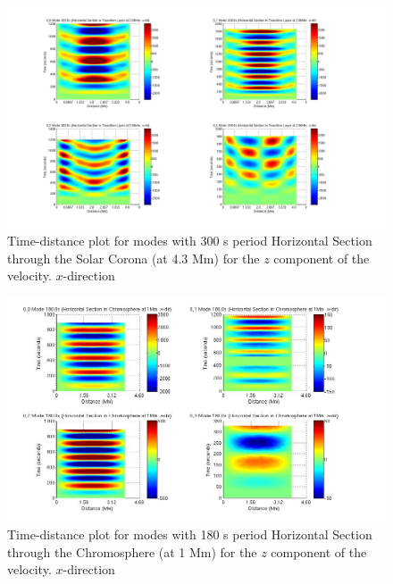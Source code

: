 \documentclass[preprint,authoryear,12pt]{elsarticle}
\begin{document}
\begin{figure}[h]
\includegraphics[scale=0.3]{imagesn/dt_300_hor_x_2p06Mm.jpg}
\caption{Time-distance plot for modes with 300 s period Horizontal Section through the Solar Corona (at 4.3 Mm) for the $z$ component of the velocity. $x$-direction}
\end{figure}


\begin{figure}[h]
\includegraphics[scale=0.45]{imagesn/dt_180_horiz_x_1Mm.jpg}
\caption{Time-distance plot for modes with 180 s period Horizontal Section through the Chromosphere (at 1 Mm) for the $z$ component of the velocity. $x$-direction}
\label{Fig14}
\end{figure}
\end{document}
